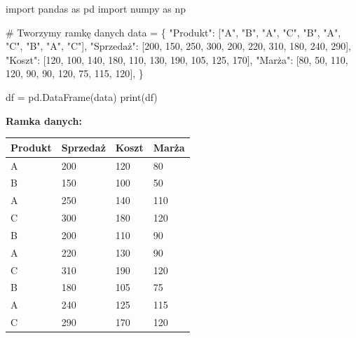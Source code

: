 \documentclass[
  polish,
  letterpaper,
  DIV=11,
  numbers=noendperiod]{scrreprt}
\newenvironment{Shaded}{\begin{snugshade}}{\end{snugshade}}
\newcommand{\BuiltInTok}[1]{\textcolor[rgb]{0.00,0.23,0.31}{#1}}
\newcommand{\CommentTok}[1]{\textcolor[rgb]{0.37,0.37,0.37}{#1}}
\newcommand{\DecValTok}[1]{\textcolor[rgb]{0.68,0.00,0.00}{#1}}
\newcommand{\ImportTok}[1]{\textcolor[rgb]{0.00,0.46,0.62}{#1}}
\newcommand{\NormalTok}[1]{\textcolor[rgb]{0.00,0.23,0.31}{#1}}
\newcommand{\OperatorTok}[1]{\textcolor[rgb]{0.37,0.37,0.37}{#1}}
\newcommand{\StringTok}[1]{\textcolor[rgb]{0.13,0.47,0.30}{#1}}
\newcounter{none} %
\begin{document}
\begin{Shaded}
\begin{Highlighting}[]
\ImportTok{import}\NormalTok{ pandas }\ImportTok{as}\NormalTok{ pd}
\ImportTok{import}\NormalTok{ numpy }\ImportTok{as}\NormalTok{ np}

\CommentTok{\# Tworzymy ramkę danych}
\NormalTok{data }\OperatorTok{=}\NormalTok{ \{}
    \StringTok{"Produkt"}\NormalTok{: [}\StringTok{"A"}\NormalTok{, }\StringTok{"B"}\NormalTok{, }\StringTok{"A"}\NormalTok{, }\StringTok{"C"}\NormalTok{, }\StringTok{"B"}\NormalTok{, }\StringTok{"A"}\NormalTok{, }\StringTok{"C"}\NormalTok{, }\StringTok{"B"}\NormalTok{, }\StringTok{"A"}\NormalTok{, }\StringTok{"C"}\NormalTok{],}
    \StringTok{"Sprzedaż"}\NormalTok{: [}\DecValTok{200}\NormalTok{, }\DecValTok{150}\NormalTok{, }\DecValTok{250}\NormalTok{, }\DecValTok{300}\NormalTok{, }\DecValTok{200}\NormalTok{, }\DecValTok{220}\NormalTok{, }\DecValTok{310}\NormalTok{, }\DecValTok{180}\NormalTok{, }\DecValTok{240}\NormalTok{, }\DecValTok{290}\NormalTok{],}
    \StringTok{"Koszt"}\NormalTok{: [}\DecValTok{120}\NormalTok{, }\DecValTok{100}\NormalTok{, }\DecValTok{140}\NormalTok{, }\DecValTok{180}\NormalTok{, }\DecValTok{110}\NormalTok{, }\DecValTok{130}\NormalTok{, }\DecValTok{190}\NormalTok{, }\DecValTok{105}\NormalTok{, }\DecValTok{125}\NormalTok{, }\DecValTok{170}\NormalTok{],}
    \StringTok{"Marża"}\NormalTok{: [}\DecValTok{80}\NormalTok{, }\DecValTok{50}\NormalTok{, }\DecValTok{110}\NormalTok{, }\DecValTok{120}\NormalTok{, }\DecValTok{90}\NormalTok{, }\DecValTok{90}\NormalTok{, }\DecValTok{120}\NormalTok{, }\DecValTok{75}\NormalTok{, }\DecValTok{115}\NormalTok{, }\DecValTok{120}\NormalTok{],}
\NormalTok{\}}

\NormalTok{df }\OperatorTok{=}\NormalTok{ pd.DataFrame(data)}
\BuiltInTok{print}\NormalTok{(df)}
\end{Highlighting}
\end{Shaded}

\textbf{Ramka danych:}

{\def\LTcaptype{none} %
\begin{longtable}[]{@{}llll@{}}
\toprule\noalign{}
Produkt & Sprzedaż & Koszt & Marża \\
\midrule\noalign{}
\endhead
\bottomrule\noalign{}
\endlastfoot
A & 200 & 120 & 80 \\
B & 150 & 100 & 50 \\
A & 250 & 140 & 110 \\
C & 300 & 180 & 120 \\
B & 200 & 110 & 90 \\
A & 220 & 130 & 90 \\
C & 310 & 190 & 120 \\
B & 180 & 105 & 75 \\
A & 240 & 125 & 115 \\
C & 290 & 170 & 120 \\
\end{longtable}
}
\end{document}
